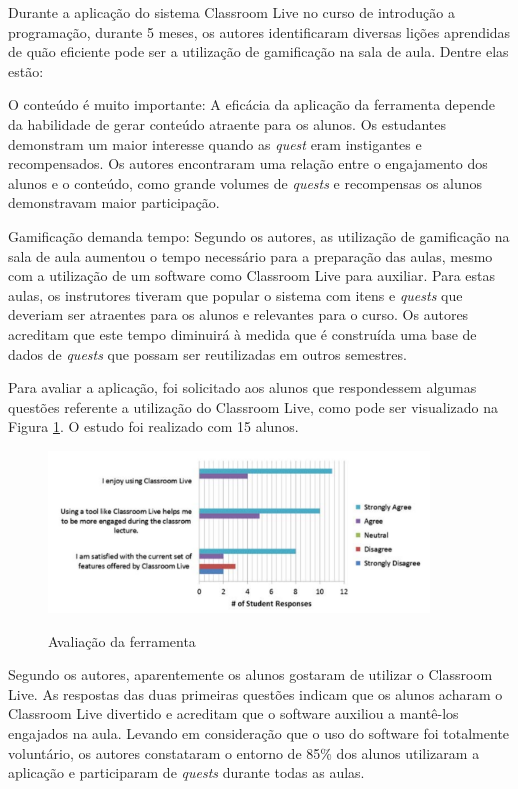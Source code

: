 \documentclass[
	12pt,				%
	oneside,			%
	a4paper,			%
	english,			%
	french,				%
	spanish,			%
	brazil,				%
	]{abntex2}
\begin{document}
Durante a aplicação do sistema Classroom Live no curso de introdução a programação, durante 5 meses, os autores identificaram diversas lições aprendidas de quão eficiente pode ser a utilização de gamificação na sala de aula. Dentre elas estão:

O conteúdo é muito importante: A eficácia da aplicação da ferramenta depende da habilidade de gerar conteúdo atraente para os alunos. Os estudantes demonstram um maior interesse quando as \textit{quest} eram instigantes e recompensados. Os autores encontraram uma relação entre o engajamento dos alunos e o conteúdo, como grande volumes de \textit{quests} e recompensas os alunos demonstravam maior participação.

Gamificação demanda tempo: Segundo os autores, as utilização de gamificação na sala de aula aumentou o tempo necessário para a preparação das aulas, mesmo com a utilização de um software como Classroom Live para auxiliar. Para estas aulas, os instrutores tiveram que popular o sistema com itens e \textit{quests} que deveriam ser atraentes para os alunos e relevantes para o curso. Os autores acreditam que este tempo diminuirá à medida que é construída uma base de dados de \textit{quests} que possam ser reutilizadas em outros semestres.

Para avaliar a aplicação, foi solicitado aos alunos que respondessem algumas questões referente a utilização do Classroom Live, como pode ser visualizado na Figura \ref{fig:classroom_avaliacao}. O estudo foi realizado com 15 alunos.

\begin{figure}[ht]
\centering
\caption{Avaliação da ferramenta}
\includegraphics[width=0.9\textwidth]{imagens/classroom_avaliacao.png}
\label{fig:classroom_avaliacao}
\end{figure}

Segundo os autores, aparentemente os alunos gostaram de utilizar o Classroom Live. As respostas das duas primeiras questões indicam que os alunos acharam o Classroom Live divertido e acreditam que o software auxiliou a mantê-los engajados na aula. Levando em consideração que o uso do software foi totalmente voluntário, os autores constataram o entorno de 85\% dos alunos utilizaram a aplicação e participaram de \textit{quests} durante todas as aulas. 
\end{document}
